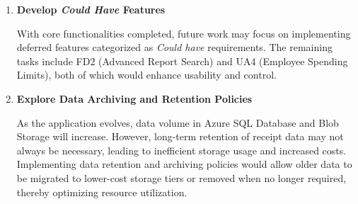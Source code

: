 \begin{enumerate} [leftmargin=0.75cm, label=\textbf{\arabic*.}]
    A useful tool to integrate into the application is structured logging, which would facilitate identifying errors and performance bottlenecks. Additionally, creating custom dashboards and alerts would support proactive monitoring of application health and early detection of issues, such as high failure rates in AI processing tasks.

    \item \textbf{Develop \textit{Could Have} Features}

    With core functionalities completed, future work may focus on implementing deferred features categorized as \textit{Could have} requirements. The remaining tasks include FD2 (Advanced Report Search) and UA4 (Employee Spending Limits), both of which would enhance usability and control.

    \item \textbf{Explore Data Archiving and Retention Policies}

    As the application evolves, data volume in Azure SQL Database and Blob Storage will increase. However, long-term retention of receipt data may not always be necessary, leading to inefficient storage usage and increased costs. Implementing data retention and archiving policies would allow older data to be migrated to lower-cost storage tiers or removed when no longer required, thereby optimizing resource utilization. 

\end{enumerate}